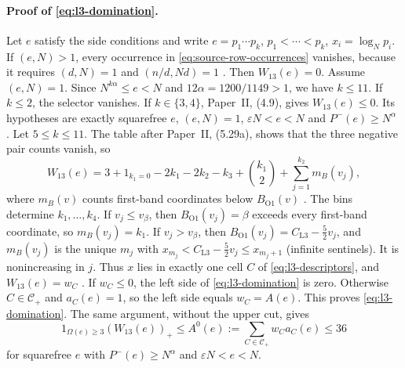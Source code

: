 \paragraph{Proof of \eqref{eq:l3-domination}.}
Let $e$ satisfy the side conditions and write $e=p_1\cdots p_k$,
$p_1<\cdots<p_k$, $x_i=\log_Np_i$.
If $(e,N)>1$, every occurrence in \eqref{eq:source-row-occurrences}
vanishes, because it requires $(d,N)=1$ and $(n/d,Nd)=1$
\cite[(1.7)]{PaperII}. Then $W_{13}(e)=0$. Assume $(e,N)=1$.
Since $N^{k\alpha}\le e<N$ and $12\alpha=1200/1149>1$, we have $k\le11$.
If $k\le2$, the selector vanishes. If $k\in\{3,4\}$, Paper~II, (4.9),
gives $W_{13}(e)\le0$. Its hypotheses are exactly squarefree $e$,
$(e,N)=1$, $\varepsilon N<e<N$ and $P^-(e)\ge N^\alpha$
\cite[(4.9)]{PaperII}.
Let $5\le k\le11$. The table after Paper~II, (5.29a), shows that the
three negative pair counts vanish, so
\[
 W_{13}(e)=3+1_{k_1=0}-2k_1-2k_2-k_3+\binom{k_1}2+\sum_{j=1}^{k_2}m_B(v_j),
\]
where $m_B(v)$ counts first-band coordinates below $B_{\mathrm{O1}}(v)$
\cite[(5.29a), (5.30)]{PaperII}. The bins determine $k_1,\ldots,k_4$.
If $v_j\le v_\beta$, then $B_{\mathrm{O1}}(v_j)=\beta$ exceeds every
first-band coordinate, so $m_B(v_j)=k_1$. If $v_j>v_\beta$, then
$B_{\mathrm{O1}}(v_j)=C_{\mathrm{L3}}-\frac52v_j$, and $m_B(v_j)$ is the unique $m_j$
with $x_{m_j}<C_{\mathrm{L3}}-\frac52v_j\le x_{m_j+1}$ (infinite sentinels).
It is nonincreasing in $j$. Thus $x$ lies in exactly one cell $C$ of
\eqref{eq:l3-descriptors}, and $W_{13}(e)=w_C$
\cite[(5.31)]{PaperII}. If $w_C\le0$, the left side of
\eqref{eq:l3-domination} is zero. Otherwise $C\in\mathcal C_+$ and
$a_C(e)=1$, so the left side equals $w_C=A(e)$. This proves
\eqref{eq:l3-domination}. The same argument, without the upper cut, gives
\begin{equation}\label{eq:l3-domination-nocut}
 1_{\Omega(e)\ge3}(W_{13}(e))_+\le A^0(e):=\sum_{C\in\mathcal C_+}w_Ca_C(e)\le36
\end{equation}
for squarefree $e$ with $P^-(e)\ge N^\alpha$ and $\varepsilon N<e<N$.

